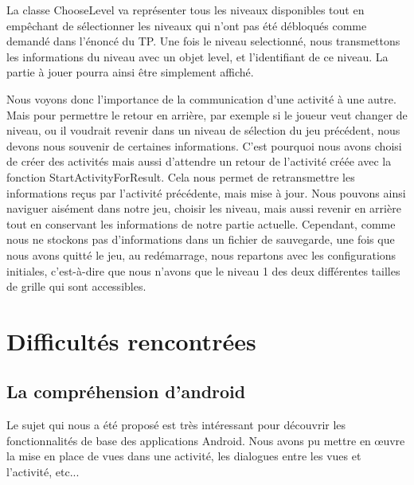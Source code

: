 \documentclass[12pt, a4paper]{article}%
\begin{document}
La classe ChooseLevel va représenter tous les niveaux disponibles tout en empêchant de sélectionner les niveaux qui n'ont pas été débloqués comme demandé dans l'énoncé du TP. Une fois le niveau selectionné, nous transmettons les informations du niveau avec un objet level, et l'identifiant de ce niveau. La partie à jouer pourra ainsi être simplement affiché.

Nous voyons donc l'importance de la communication d'une activité à une autre. Mais pour permettre le retour en arrière, par exemple si le joueur veut changer de niveau, ou il voudrait revenir dans un niveau de sélection du jeu précédent, nous devons nous souvenir de certaines informations. C'est pourquoi nous avons choisi de créer des activités mais aussi d'attendre un retour de l'activité créée avec la fonction StartActivityForResult. Cela nous permet de retransmettre les informations reçus par l'activité précédente, mais mise à jour. Nous pouvons ainsi naviguer aisément dans notre jeu, choisir les niveau, mais aussi revenir en arrière tout en conservant les informations de notre partie actuelle. Cependant, comme nous ne stockons pas d'informations dans un fichier de sauvegarde, une fois que nous avons quitté le jeu, au redémarrage, nous repartons avec les configurations initiales, c'est-à-dire que nous n'avons que le niveau 1 des deux différentes tailles de grille qui sont accessibles.  

\section{Difficultés rencontrées}
  \subsection{La compréhension d'android}
  Le sujet qui nous a été proposé est très intéressant pour découvrir les fonctionnalités de base des applications Android. Nous avons pu mettre en œuvre la mise en place de vues dans une activité, les dialogues entre les vues et l'activité, etc...
  
\end{document}
